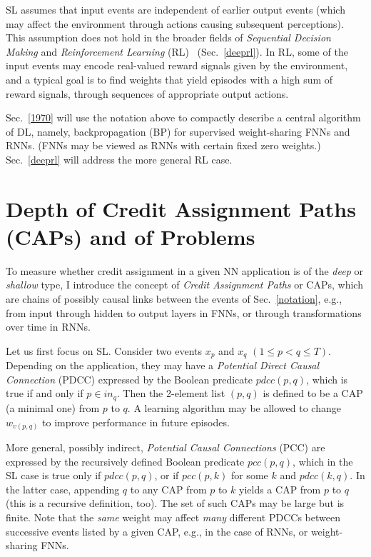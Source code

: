 \documentclass[letterpaper]{article}
\begin{document}
\begin{CJK*}{UTF8}{gbsn}
SL assumes that input events are independent of earlier output events (which may affect
the environment  through actions causing subsequent perceptions).
This assumption does not hold 
in the broader fields of {\em Sequential Decision Making} and  {\em Reinforcement Learning} (RL)~\citep{Kaelbling:96,Sutton:98,Hutter:05book+,wiering2012} (Sec.~\ref{deeprl}).
In RL, some of the input events may encode real-valued reward signals given by the environment, 
and a typical goal is to find weights that yield episodes with a high sum of reward signals,
through sequences of appropriate output actions.

Sec.~\ref{1970} will use the notation above to compactly 
describe a central algorithm of DL, namely,
backpropagation (BP) for supervised weight-sharing FNNs and RNNs.
(FNNs may be viewed as RNNs with certain fixed zero weights.)
Sec.~\ref{deeprl} will address the more general RL case.




\section{Depth of Credit Assignment Paths (CAPs) and of Problems}
\label{caps}

To measure whether credit assignment in a given 
NN application is of the {\em deep} or {\em shallow} type,
I introduce the concept of {\em Credit Assignment Paths} or CAPs,
which are chains of possibly causal links between the events of Sec.~\ref{notation},
e.g., from input through hidden to output layers in FNNs, or through 
transformations over time in RNNs. 

Let us first focus on SL.
Consider two events 
$x_p$ and $x_q$ $(1 \leq p < q \leq T)$.
Depending on the application, they may have a
{\em Potential Direct Causal Connection} (PDCC) expressed by the Boolean
predicate $pdcc(p,q)$, which
is true if and only if $p \in in_q$.
Then the 2-element list $(p,q)$ is defined to be a CAP (a minimal one) from $p$ to $q$.
A learning algorithm may be allowed to change  $w_{v(p,q)}$ to improve performance
in future episodes.

More general, possibly indirect,
{\em Potential Causal Connections} (PCC) are expressed by the 
recursively defined Boolean
predicate $pcc(p,q)$, which in the SL case 
is true only if $pdcc(p,q)$, or if
$pcc(p,k)$ for some $k$ and $pdcc(k,q)$.
In the latter case,
appending $q$ to any CAP from $p$ to $k$ yields a CAP from $p$ to $q$
 (this is a recursive definition, too).
The set of such CAPs may be large but is finite. 
Note that the {\em same} weight may affect {\em many} different PDCCs
between successive events listed by a given CAP, 
e.g., in the case of RNNs, or weight-sharing FNNs.


\end{CJK*}
\end{document}
